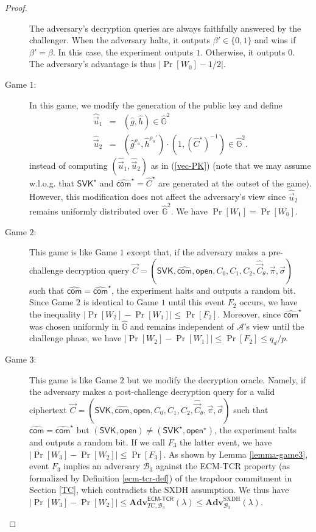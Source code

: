 \documentclass[10pt]{llncs}
\newcommand{\A}{\mathcal{A}}
\newcommand{\B}{\mathcal{B}}
\newcommand{\G}{\mathbb{G}}
\newcommand{\SVK}{\mathsf{SVK}}
\newcommand{\com}{\hat{\mathsf{com}}}
\newcommand{\open}{\mathsf{open}}
\begin{document}
\begin{proof}
\begin{description}
   The adversary's decryption queries are always faithfully answered by the challenger. When the adversary halts, it outputs   
    $\beta' \in \{0,1\}$ and wins if $\beta' =\beta$. In this case, the experiment outputs $1$. Otherwise, it outputs $0$.  
    The adversary's advantage is thus $|\Pr[W_0]-1/2|$. \smallskip \smallskip 

  \item[\textsf{Game} $1$:] In this game, we modify the generation of the public key and define
    \begin{eqnarray} \label{vec-PK-sim} 
      \hat{\vec{u}}_1 &=& (\hat{g}, \hat{h}) \in \hat{\G}^2  \\ \nonumber 
      \hat{\vec{u}}_2 &=&  (\hat{g}^{\rho_u}, \hat{h}^{\rho_u'}) \cdot (1,({\hat{C}^\star})^{-1})  \in \hat{\G}^2.
    \end{eqnarray}
    instead of computing $(\hat{\vec{u}}_1,\hat{\vec{u}}_2)$ as in (\ref{vec-PK}) (note that we may assume w.l.o.g. that $\SVK^\star$ and $\com^\star=\hat{C}^\star$ are 
    generated 
    at the outset of the game).  However, this modification does not affect the adversary's view since $\hat{\vec{u}}_2$ remains uniformly distributed 
    over $\hat{\G}^2$. We have $\Pr[W_1]=\Pr[W_0]$.   \smallskip \smallskip 

  \item[\textsf{Game} $2$:] This game is like Game $1$ except that, if the adversary makes a pre-challenge decryption query 
    $ \vec{C} = (\SVK, \com, \open, C_0, C_1, C_2, \hat{\vec{C}}_{\theta}, \vec{\pi}, \vec{\sigma})  $ such that $\com=\com^\star$, the experiment halts and 
    outputs a random bit. Since Game $2$ is identical to Game $1$ until this event $F_2$ occurs, we have the inequality 
    $|\Pr[W_2]-\Pr[W_1]| \leq \Pr[F_2]$. Moreover, since $\com^\star$ was chosen uniformly in $\hat{\G}$ and remains independent of $\A$'s view until 
    the challenge phase, we have $ |\Pr[W_2]-\Pr[W_1]| \leq \Pr[F_2] \leq q_d/p$. \smallskip \smallskip 


  \item[\textsf{Game} $3$:] This game is like Game $2$ but we modify the decryption oracle. Namely, if the adversary makes a post-challenge decryption query 
    for a valid ciphertext
    $ \vec{C} = (\SVK, \com, \open, C_0, C_1, C_2, \hat{\vec{C}}_{\theta}, \vec{\pi}, \vec{\sigma})  $
    such that $\com=\com^\star$ but $(\SVK,\open) \neq (\SVK^\star,\open^\star)$, the experiment halts and outputs a random bit. If we call $F_3$ the latter event, 
    we have $|\Pr[W_3]-\Pr[W_2]| \leq \Pr[F_3]$. As shown by Lemma  \ref{lemma-game3},   event $F_3$   implies an adversary $\B_3$ against the ECM-TCR property (as formalized 
		by Definition \ref{ecm-tcr-def}) of the 
     trapdoor commitment in Section \ref{TC}, which contradicts the SXDH assumption. We thus have    
    $|\Pr[W_3]-\Pr[W_2]| 
      \leq \mathbf{Adv}_{TC,\B_3}^{\mathsf{ECM}\textsf{-}\mathsf{TCR}}(\lambda) 
      \leq   \mathbf{Adv}_{\B_3}^{\mathrm{SXDH}}(\lambda)$.   
    \smallskip \smallskip 



\end{description}
\end{proof}
\end{document}

